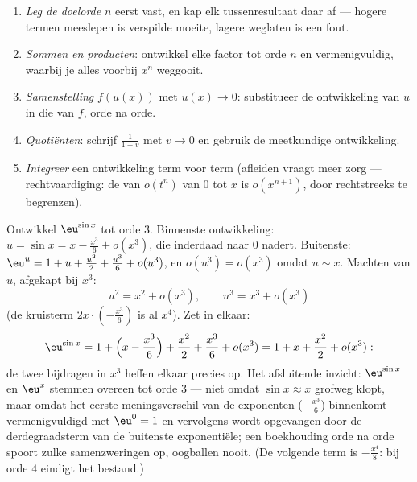 \begin{method}\label{met:b1:taylor:compute}
\begin{enumerate}
  \item \emph{Leg de doelorde} $n$ eerst vast, en kap elk
        tussenresultaat daar af --- hogere termen meeslepen is
        verspilde moeite, lagere weglaten is een fout.
  \item \emph{Sommen en producten}: ontwikkel elke factor tot orde
        $n$ en vermenigvuldig, waarbij je alles voorbij $x^n$
        weggooit.
  \item \emph{Samenstelling} $f(u(x))$ met $u(x) \to 0$: substitueer
        de ontwikkeling van $u$ in die van $f$, orde na orde.
  \item \emph{Quotiënten}: schrijf $\frac{1}{1 + v}$ met $v \to 0$
        en gebruik de meetkundige ontwikkeling.
  \item \emph{Integreer} een ontwikkeling term voor term (afleiden
        vraagt meer zorg --- rechtvaardiging: de  van
        $o(t^n)$ van $0$ tot $x$ is $o(x^{n+1})$, door rechtstreeks
        te begrenzen).
\end{enumerate}
\end{method}

\begin{example}\label{ex:b1:taylor:esin}
Ontwikkel $\eu^{\sin x}$ tot orde $3$. Binnenste ontwikkeling: $u
= \sin x = x - \frac{x^3}{6} + o(x^3)$, die inderdaad naar $0$
nadert. Buitenste: $\eu^u = 1 + u + \frac{u^2}{2} +
\frac{u^3}{6} + o(u^3)$, en $o(u^3) = o(x^3)$ omdat $u \sim x$.
Machten van $u$, afgekapt bij $x^3$:
\[
u^2 = x^2 + o(x^3), \qquad u^3 = x^3 + o(x^3)
\]
(de kruisterm $2x\cdot(-\frac{x^3}{6})$ is al $x^4$). Zet in
elkaar:
\[
\eu^{\sin x} = 1 + \Bigl(x - \frac{x^3}{6}\Bigr) + \frac{x^2}{2}
+ \frac{x^3}{6} + o(x^3)
= 1 + x + \frac{x^2}{2} + o(x^3) :
\]
de twee bijdragen in $x^3$ heffen elkaar precies op. Het
afsluitende inzicht: $\eu^{\sin x}$ en $\eu^x$ stemmen overeen
tot orde $3$ --- niet omdat $\sin x \approx x$ grofweg klopt,
maar omdat het eerste meningsverschil van de exponenten
($-\frac{x^3}{6}$) binnenkomt vermenigvuldigd met $\eu^0 = 1$ en
vervolgens wordt opgevangen door de derdegraadsterm van de
buitenste exponentiële; een boekhouding orde na orde spoort zulke
samenzweringen op, oogballen nooit. (De volgende term is
$-\frac{x^4}{8}$: bij orde $4$ eindigt het bestand.)
\end{example}

